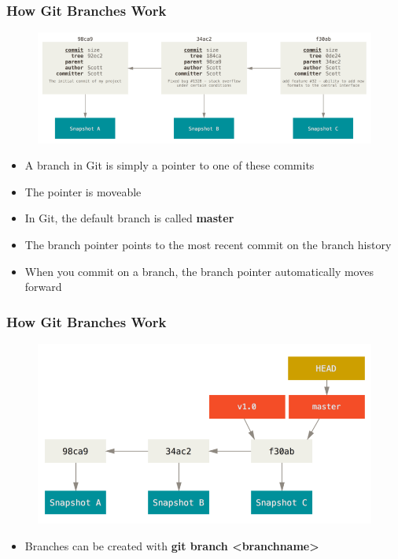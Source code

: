 \documentclass{beamer}
\begin{document}
\begin{frame}
	\frametitle{How Git Branches Work}
	\begin{figure}
		\includegraphics[scale=0.30]{How_Git_Branches_Work-0.png}
	\end{figure}
	\begin{itemize}
		\item{A branch in Git is simply a pointer to one of these commits}
		\item{The pointer is moveable}
		\item{In Git, the default branch is called \textbf{master}}
		\item{The branch pointer points to the most recent commit on the branch history}
		\item{When you commit on a branch, the branch pointer automatically moves forward}
	\end{itemize}
\end{frame}

\begin{frame}
	\frametitle{How Git Branches Work}
	\begin{figure}
		\includegraphics[scale=0.30]{How_Git_Branches_Work-1.png}
	\end{figure}
	\begin{itemize}
		\item{Branches can be created with \textbf{git branch \textless{}branchname\textgreater{}}}
	\end{itemize}
\end{frame}
\end{document}
